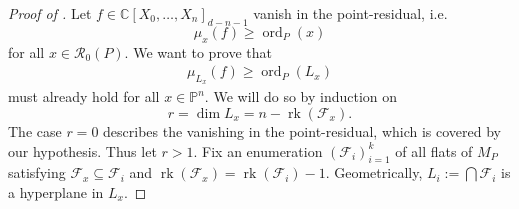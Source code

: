 \documentclass[a4paper,10pt]{amsart}
\theoremstyle{definition}
\theoremstyle{plain}
\newcommand{\ord}{\operatorname{ord}}
\newcommand{\rk}{\operatorname{rk}}
\newcommand{\cF}{{\mathcal F}}
\newcommand{\cR}{{\mathcal R}}
\newcommand{\C}{{\mathbb C}}
\newcommand{\pp}{\mathbb{P}}
\begin{document}
\begin{proof}[Proof of ]
Let $f \in \C[X_0, \dots, X_n]_{d-n-1}$ vanish in the point-residual, i.e.
\begin{equation*} \label{eq:pointresidual}
    \mu_x(f) \geq \ord_P(x)
\end{equation*}
for all $x \in \cR_0(P)$. We want to prove that \begin{align*}
    \mu_{L_x}(f)\geq \ord_P(L_x)
\end{align*}must already hold for all $x \in \pp^n$. We will do so by induction on
\begin{equation*}
    r = \dim L_x = n-\rk(\cF_x).
\end{equation*}
The case $r = 0$ describes the vanishing in the point-residual, which is covered by our hypothesis. Thus let $r > 1$. Fix an enumeration $(\cF_i)_{i=1}^k$ of all flats of $M_P$ satisfying $\cF_x \subseteq \cF_i$ and $\rk(\cF_x) = \rk(\cF_i) - 1$. Geometrically, $L_i:=\bigcap\cF_i$ is a hyperplane in $L_x$.


\end{proof}
\end{document}
